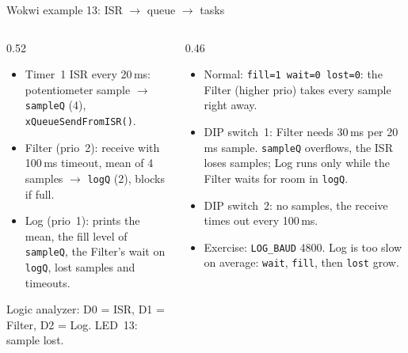 \begin{frame}{Wokwi example 13: ISR $\rightarrow$ queue $\rightarrow$ tasks}
  \begin{columns}[T]
    \begin{column}{0.52\textwidth}
      \small
      \begin{itemize}
        \item Timer~1 ISR every 20\,ms: potentiometer sample $\rightarrow$ \texttt{sampleQ} (4), \texttt{xQueueSendFromISR()}.
        \item Filter (prio~2): receive with 100\,ms timeout, mean of 4 samples $\rightarrow$ \texttt{logQ} (2), blocks if full.
        \item Log (prio~1): prints the mean, the fill level of \texttt{sampleQ}, the Filter's wait on \texttt{logQ}, lost samples and timeouts.
      \end{itemize}
      Logic analyzer: D0 = ISR, D1 = Filter, D2 = Log. LED~13: sample lost.
    \end{column}
    \begin{column}{0.46\textwidth}
      \small
      \begin{itemize}
        \item Normal: \texttt{fill=1 wait=0 lost=0}: the Filter (higher prio) takes every sample right away.
        \item DIP switch~1: Filter needs 30\,ms per 20\,ms sample. \texttt{sampleQ} overflows, the ISR loses samples; Log runs only while the Filter waits for room in \texttt{logQ}.
        \item DIP switch~2: no samples, the receive times out every 100\,ms.
        \item Exercise: \texttt{LOG\_BAUD} 4800. Log is too slow on average: \texttt{wait}, \texttt{fill}, then \texttt{lost} grow.
      \end{itemize}
    \end{column}
  \end{columns}
\end{frame}

